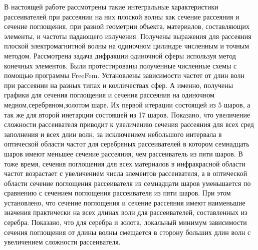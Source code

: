 \conclusion
В настоящей работе рассмотрены такие интегральные характеристики рассеивателей при рассеянии на них плоской волны как сечение рассеяния и сечение поглощения, при разной геометрии объекта, материалов, составляющих элементы, и частоты падающего излучения. Получены выражения для рассеяния плоской электромагнитной волны на одиночном цилиндре численным и точным методом. Рассмотрена задача дифракции одиночной сферы используя метод конечных элементов. Были протестированы полученные численные схемы с помощью программы FreeFem. Установлены зависимости частот от длин волн при рассеянии на разных типах и колличествах сфер. А именно, получены графики для сечения поглощения и сечения рассеяния на одиночном медном,серебряном,золотом шаре. Их первой итерации состоящей из 5 шаров, а так же для второй инетарции состоящей из 17 шаров. Показано, что увеличение сложности рассеивателя приводит к увеличению сечения рассеяния для всех сред заполнения и всех длин волн, за исключением небольшого интервала в оптической области частот для серебряных рассеивателей в котором семнадцать шаров имеют меньшее сечение рассеяния, чем рассеиватель из пяти шаров.
В тоже время, сечения поглощения для всех материалов в инфракрасной области частот возрастает с увеличением числа элементов рассеивателя, а в оптической области сечение поглощения рассеивателя из семнадцати шаров уменьшается по сравнению с сечением поглощения рассеивателя из пяти шаров.
При этом установлено, что сечение поглощения и сечение рассеяния имеют наименьшие значения практически на всех длинах волн для рассеивателей, составленных из серебра. 
Показано, что для серебра и золота, локальный минимум зависимости сечения поглощения от длины волны смещается в сторону больших длин волн с увеличением сложности рассеивателя.

